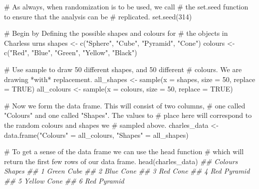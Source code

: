 \documentclass[
  letterpaper,
  DIV=11,
  numbers=noendperiod]{scrreprt}
\newenvironment{Shaded}{\begin{snugshade}}{\end{snugshade}}
\newcommand{\AttributeTok}[1]{\textcolor[rgb]{0.40,0.45,0.13}{#1}}
\newcommand{\CommentTok}[1]{\textcolor[rgb]{0.37,0.37,0.37}{#1}}
\newcommand{\ConstantTok}[1]{\textcolor[rgb]{0.56,0.35,0.01}{#1}}
\newcommand{\DecValTok}[1]{\textcolor[rgb]{0.68,0.00,0.00}{#1}}
\newcommand{\DocumentationTok}[1]{\textcolor[rgb]{0.37,0.37,0.37}{\textit{#1}}}
\newcommand{\FunctionTok}[1]{\textcolor[rgb]{0.28,0.35,0.67}{#1}}
\newcommand{\NormalTok}[1]{\textcolor[rgb]{0.00,0.23,0.31}{#1}}
\newcommand{\OtherTok}[1]{\textcolor[rgb]{0.00,0.23,0.31}{#1}}
\newcommand{\StringTok}[1]{\textcolor[rgb]{0.13,0.47,0.30}{#1}}
\theoremstyle{definition}
\theoremstyle{definition}
\theoremstyle{definition}
\theoremstyle{remark}
\begin{document}
\begin{Shaded}
\begin{Highlighting}[]
\CommentTok{\# As always, when randomization is to be used, we call}
\CommentTok{\# the set.seed function to ensure that the analysis can be}
\CommentTok{\# replicated.}
\FunctionTok{set.seed}\NormalTok{(}\DecValTok{314}\NormalTok{)}

\CommentTok{\# Begin by Defining the possible shapes and colours for}
\CommentTok{\# the objects in Charles\textquotesingle{}s urns}
\NormalTok{shapes }\OtherTok{\textless{}{-}} \FunctionTok{c}\NormalTok{(}\StringTok{"Sphere"}\NormalTok{, }\StringTok{"Cube"}\NormalTok{, }\StringTok{"Pyramid"}\NormalTok{, }\StringTok{"Cone"}\NormalTok{)}
\NormalTok{colours }\OtherTok{\textless{}{-}} \FunctionTok{c}\NormalTok{(}\StringTok{"Red"}\NormalTok{, }\StringTok{"Blue"}\NormalTok{, }\StringTok{"Green"}\NormalTok{, }\StringTok{"Yellow"}\NormalTok{, }\StringTok{"Black"}\NormalTok{)}

\CommentTok{\# Use sample to draw 50 different shapes, and 50 different}
\CommentTok{\# colours. We are drawing *with* replacement.}
\NormalTok{all\_shapes }\OtherTok{\textless{}{-}} \FunctionTok{sample}\NormalTok{(}\AttributeTok{x =}\NormalTok{ shapes, }\AttributeTok{size =} \DecValTok{50}\NormalTok{, }\AttributeTok{replace =} \ConstantTok{TRUE}\NormalTok{)}
\NormalTok{all\_colours }\OtherTok{\textless{}{-}} \FunctionTok{sample}\NormalTok{(}\AttributeTok{x =}\NormalTok{ colours, }\AttributeTok{size =} \DecValTok{50}\NormalTok{, }\AttributeTok{replace =} \ConstantTok{TRUE}\NormalTok{)}

\CommentTok{\# Now we form the data frame. This will consist of two columns,}
\CommentTok{\# one called "Colours" and one called "Shapes". The values to }
\CommentTok{\# place here will correspond to the random colours and shapes we}
\CommentTok{\# sampled above.}
\NormalTok{charles\_data }\OtherTok{\textless{}{-}} \FunctionTok{data.frame}\NormalTok{(}\StringTok{"Colours"} \OtherTok{=}\NormalTok{ all\_colours, }\StringTok{"Shapes"} \OtherTok{=}\NormalTok{ all\_shapes)}

\CommentTok{\# To get a sense of the data frame we can use the head function}
\CommentTok{\# which will return the first few rows of our data frame.}
\FunctionTok{head}\NormalTok{(charles\_data)}
\DocumentationTok{\#\#   Colours  Shapes}
\DocumentationTok{\#\# 1   Green    Cube}
\DocumentationTok{\#\# 2    Blue    Cone}
\DocumentationTok{\#\# 3     Red    Cone}
\DocumentationTok{\#\# 4     Red Pyramid}
\DocumentationTok{\#\# 5  Yellow    Cone}
\DocumentationTok{\#\# 6     Red Pyramid}
\end{Highlighting}
\end{Shaded}
\end{document}
